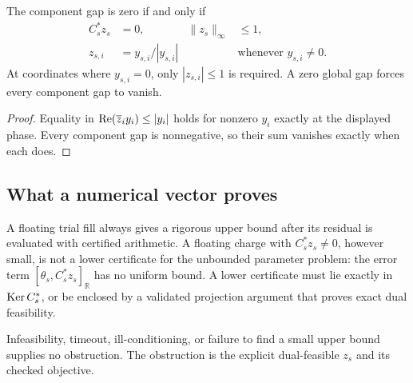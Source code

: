 \begin{corollary}
\label{cor:phase-saturation}
The component gap is zero if and only if
\begin{align*}
 C_s^*z_s&=0,&
 \|z_s\|_\infty&\le1,\\
 z_{s,i}&=y_{s,i}/|y_{s,i}|
 &&\text{whenever }y_{s,i}\ne0.
\end{align*}
At coordinates where \(y_{s,i}=0\), only
\(|z_{s,i}|\le1\) is required. A zero global gap forces every component
gap to vanish.
\end{corollary}

\begin{proof}
Equality in
\(\operatorname{Re}(\overline z_i y_i)\le |y_i|\) holds for nonzero \(y_i\)
exactly at the displayed phase. Every component gap is nonnegative, so
their sum vanishes exactly when each does.
\end{proof}

\subsection{What a numerical vector proves}

A floating trial fill always gives a rigorous upper bound after its
residual is evaluated with certified arithmetic. A floating charge with
\(C_s^*z_s\ne0\), however small, is not a lower certificate for the
unbounded parameter problem: the error term
\([\theta_s,C_s^*z_s]_{\mathbb R}\) has no uniform bound. A lower
certificate must lie exactly in \(\operatorname{Ker} C_s^*\), or be enclosed by a
validated projection argument that proves exact dual feasibility.

\begin{remark}
Infeasibility, timeout, ill-conditioning, or failure to find a small
upper bound supplies no obstruction. The obstruction is the explicit
dual-feasible \(z_s\) and its checked objective.
\end{remark}
